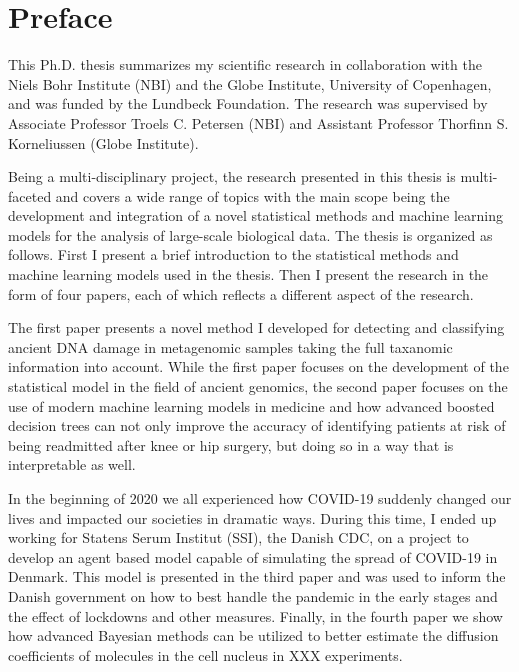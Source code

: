 \chapter{Preface}
This Ph.D. thesis summarizes my scientific research in collaboration with the Niels Bohr Institute (NBI) and the Globe Institute, University of Copenhagen, and was funded by the Lundbeck Foundation. The research was supervised by Associate Professor Troels C. Petersen (NBI) and Assistant Professor Thorfinn S. Korneliussen (Globe Institute).

Being a multi-disciplinary project, the research presented in this thesis is multi-faceted and covers a wide range of topics with the main scope being the development and integration of a novel statistical methods and machine learning models for the analysis of large-scale biological data. The thesis is organized as follows. First I present a brief introduction to the statistical methods and machine learning models used in the thesis. Then I present the research in the form of four papers, each of which reflects a different aspect of the research.

The first paper presents a novel method I developed for detecting and classifying ancient DNA damage in metagenomic samples taking the full taxanomic information into account. While the first paper focuses on the development of the statistical model in the field of ancient genomics, the second paper focuses on the use of modern machine learning models in medicine and how advanced boosted decision trees can not only improve the accuracy of identifying patients at risk of being readmitted after knee or hip surgery, but doing so in a way that is interpretable as well.

In the beginning of 2020 we all experienced how COVID-19 suddenly changed our lives and impacted our societies in dramatic ways. During this time, I ended up working for Statens Serum Institut (SSI), the Danish CDC, on a project to develop an agent based model capable of simulating the spread of COVID-19 in Denmark. This model is presented in the third paper and was used to inform the Danish government on how to best handle the pandemic in the early stages and the effect of lockdowns and other measures. Finally, in the fourth paper we show how advanced Bayesian methods can be utilized to better estimate the diffusion coefficients of molecules in the cell nucleus in XXX experiments.

